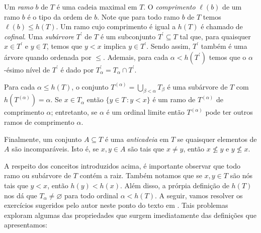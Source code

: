 \documentclass[a4paper]{article}
\begin{document}
Um \emph{ramo} \(b\) de \(T\) é uma cadeia maximal em \(T\).  O \emph{comprimento}
\(\ell(b)\) de um ramo \(b\) é o tipo da ordem de \(b\). Note que para
todo ramo \(b\) de \(T\) temos \(\ell (b)\leq h(T)\).
Um ramo cujo comprimento é igual a \(h(T)\) é chamado de \emph{cofinal}.
Uma \emph{subárvore} \(T^\prime\) de \(T\) é um subconjunto
\(T^\prime\subseteq T\) tal que, para quaisquer \(x\in T^\prime\) e \(y\in T\),
temos que \(y<x\) implica \(y\in T^\prime\).
Sendo assim, \(T^\prime\) também é uma árvore quando ordenada por \(\leq\).
Ademais, para cada \(\alpha < h(T^\prime)\) temos que o \(\alpha\)-ésimo nível
de \(T^\prime\) é dado por \(T_\alpha^\prime= T_\alpha \cap T^\prime\).

 Para cada \(\alpha\leq h(T)\), o conjunto \(T^{(\alpha)}=\bigcup_{\beta <
   \alpha} T_\beta\) é uma subárvore de \(T\) com  \(h(T^{(\alpha)})=\alpha\).
 Se \(x\in T_\alpha\) então \(\{y\in T\,\colon y < x\}\) é um ramo de \(T^{(\alpha)}\) de
comprimento \(\alpha\); entretanto, se \(\alpha\) é um ordinal limite então
\(T^{(\alpha)}\) pode ter outros ramos de comprimento \(\alpha\).

Finalmente, um conjunto \(A\subseteq T\) é uma \emph{anticadeia} em \(T\) se
quaisquer elementos de \(A\) são incomparáveis. Isto é, se \(x,y\in A\) são tais
que \(x\not = y\), então \(x\not \leq y\) e \(y\not \leq x\).

A respeito dos conceitos introduzidos acima, é importante observar que todo
ramo ou subárvore de \(T\) contém a raiz. Também notamos que se \(x,y\in T\)
são nós tais que \(y< x\), então \(h(y) <h(x)\). Além disso, a prórpia definição
de \(h(T)\) nos dá que \(T_\alpha\not=\varnothing\) para todo ordinal
\(\alpha<h(T)\). A seguir, vamos resolver os
exercícios sugeridos pelo autor neste ponto do texto em \cite{jech}. Tais problemas
exploram algumas das propriedades que surgem imediatamente das
definições que apresentamos:
\end{document}
